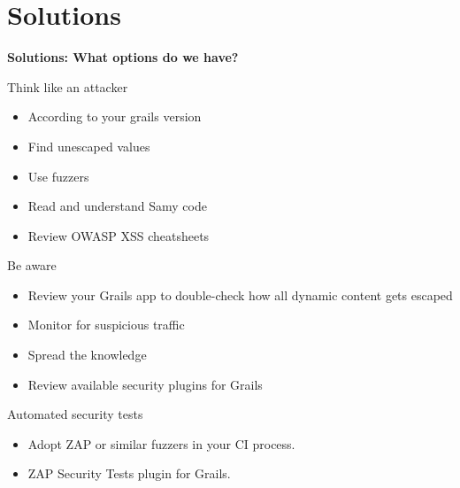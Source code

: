 
\section{Solutions}

\begin{frame}[plain]
    \begin{center}
      \Huge\bfseries
      Solutions: What options do we have?
    \end{center}
\end{frame}

\begin{frame}[plain]{Think like an attacker}
  \begin{itemize}
    \item According to your grails version
    \item Find unescaped values
    \item Use fuzzers
    \item Read and understand Samy code
    \item Review OWASP XSS cheatsheets
  \end{itemize}
\end{frame}

\begin{frame}[plain]{Be aware}
  \begin{itemize}
    \item Review your Grails app to double-check how all dynamic content gets escaped
    \item Monitor for suspicious traffic
    \item Spread the knowledge
    \item Review available security plugins for Grails
  \end{itemize}
\end{frame}

\begin{frame}[plain]{Automated security tests}
  \begin{itemize}
    \item Adopt ZAP or similar fuzzers in your CI process.
    \item ZAP Security Tests plugin for Grails.
  \end{itemize}

  \begin{center}
  \end{center}
\end{frame}


